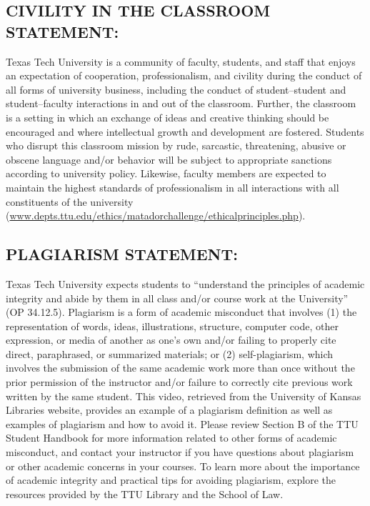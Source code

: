\documentclass[12pt]{article}
\begin{document}
 
\subsection*{CIVILITY IN THE CLASSROOM STATEMENT:}

Texas Tech University is a community of faculty, students, and staff that enjoys an expectation of cooperation, professionalism, and civility during the conduct of all forms of university business, including the conduct of student–student and student–faculty interactions in and out of the classroom. Further, the classroom is a setting in which an exchange of ideas and creative thinking should be encouraged and where intellectual growth and development are fostered. Students who disrupt this classroom mission by rude, sarcastic, threatening, abusive or obscene language and/or behavior will be subject to appropriate sanctions according to university policy. Likewise, faculty members are expected to maintain the highest standards of professionalism in all interactions with all constituents of the university (\url{www.depts.ttu.edu/ethics/matadorchallenge/ethicalprinciples.php}).

 
\subsection*{PLAGIARISM STATEMENT:}

Texas Tech University expects students to “understand the principles of academic integrity and abide by them in all class and/or course work at the University” (OP 34.12.5). Plagiarism is a form of academic misconduct that involves (1) the representation of words, ideas, illustrations, structure, computer code, other expression, or media of another as one's own and/or failing to properly cite direct, paraphrased, or summarized materials; or (2) self-plagiarism, which involves the submission of the same academic work more than once without the prior permission of the instructor and/or failure to correctly cite previous work written by the same student. This video, retrieved from the University of Kansas Libraries website, provides an example of a plagiarism definition as well as examples of plagiarism and how to avoid it. Please review Section B of the TTU Student Handbook for more information related to other forms of academic misconduct, and contact your instructor if you have questions about plagiarism or other academic concerns in your courses. To learn more about the importance of academic integrity and practical tips for avoiding plagiarism, explore the resources provided by the TTU Library and the School of Law.
\end{document}
